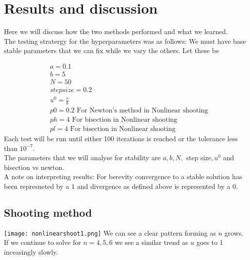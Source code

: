 \documentclass{article}
\begin{document}
\section{Results and discussion}
Here we will discuss how the two methods performed and what we learned. \\
The testing stratergy for the hyperparameters was as follows: We must have base stable parameters that we can fix while we vary the others. Let these be

\begin{align*}
 & a = 0.1 \\
 & b = 5 \\
 & N = 50 \\
 & step size = 0.2 \\
 & u^0 = \frac{r}{b} \\
 & p0 = 0.2 \text{ \ \ \ \ For Newton's method in Nonlinear   shooting}\\
 & ph = 4 \text{ \ \ \ \ For bisection in Nonlinear shooting}\\
 & pl = 4 \text{ \ \ \ \ For bisection in Nonlinear shooting}
\end{align*}
Each test will be run until either 100 iterations is reached or the tolerance less than $10^{-7}$. \\
The parameters that we will analyse for stability are $a,b,N,$ step size$,u^0$ and bisection vs newton. \\
A note on interpreting results: For berevity convergence to a stable solution has been represneted by a $1$ and divergence as defined above is represented by a $0$.  
\subsection{Shooting method}
\texttt{[image: nonlinearshoot1.png]}
We can see a clear pattern forming as $n$ grows. If we continue to solve for $n=4,5,6$ we see a similar trend as $u$ goes to 1 inceasingly slowly. \\
\end{document}
